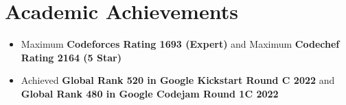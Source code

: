 \documentclass[]{ishaan-kamra-resume}
\begin{document}
\begin{minipage}[t]{0.66\textwidth}

    \section{Academic Achievements}
    \begin{itemize}
        \item Maximum \textbf{Codeforces Rating 1693 (Expert)} and Maximum \textbf{Codechef Rating 2164 (5 Star)}
        \item Achieved \textbf{Global Rank 520 in Google Kickstart Round C 2022} and \textbf{Global Rank 480 in Google Codejam Round 1C 2022}
    \end{itemize}
    \sectionsep

\end{minipage}
\end{document}
